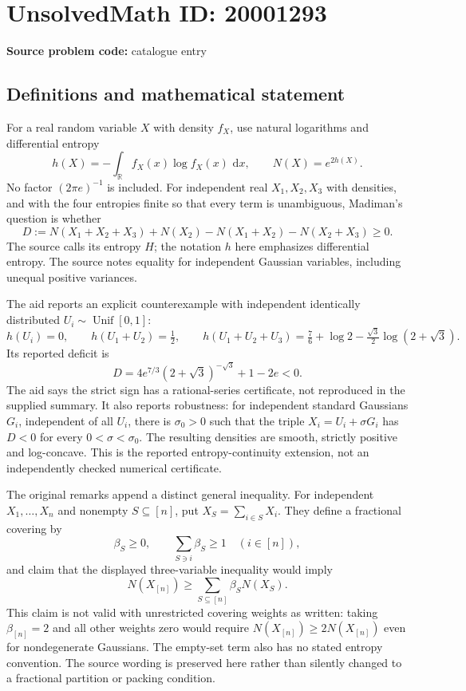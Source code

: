 \documentclass[11pt]{article}
\newcommand{\R}{\mathbb{R}}
\newcommand{\dd}{\,\mathrm{d}}
\begin{document}
\section*{UnsolvedMath ID: 20001293}
\textbf{Source problem code:} catalogue entry
\subsection{Definitions and mathematical statement}
For a real random variable \(X\) with density \(f_X\), use natural logarithms and differential entropy
\[
 h(X)=-\int_{\R}f_X(x)\log f_X(x)\,\dd x,\qquad N(X)=e^{2h(X)}.
\]
No factor \((2\pi e)^{-1}\) is included. For independent real \(X_1,X_2,X_3\) with densities, and with the four entropies finite so that every term is unambiguous, Madiman's question is whether
\[
 D:=N(X_1+X_2+X_3)+N(X_2)-N(X_1+X_2)-N(X_2+X_3)\geq0.
\]
The source calls its entropy \(H\); the notation \(h\) here emphasizes differential entropy. The source notes equality for independent Gaussian variables, including unequal positive variances.

The aid reports an explicit counterexample with independent identically distributed \(U_i\sim\operatorname{Unif}[0,1]\):
\[
 h(U_i)=0,\qquad h(U_1+U_2)=\tfrac12,\qquad
 h(U_1+U_2+U_3)=\tfrac76+\log2-\tfrac{\sqrt3}{2}\log(2+\sqrt3).
\]
Its reported deficit is
\[
 D=4e^{7/3}(2+\sqrt3)^{-\sqrt3}+1-2e<0.
\]
The aid says the strict sign has a rational-series certificate, not reproduced in the supplied summary. It also reports robustness: for independent standard Gaussians \(G_i\), independent of all \(U_i\), there is \(\sigma_0>0\) such that the triple \(X_i=U_i+\sigma G_i\) has \(D<0\) for every \(0<\sigma<\sigma_0\). The resulting densities are smooth, strictly positive and log-concave. This is the reported entropy-continuity extension, not an independently checked numerical certificate.

The original remarks append a distinct general inequality. For independent \(X_1,\ldots,X_n\) and nonempty \(S\subseteq[n]\), put \(X_S=\sum_{i\in S}X_i\). They define a fractional covering by
\[
 \beta_S\geq0,\qquad\sum_{S\ni i}\beta_S\geq1\quad(i\in[n]),
\]
and claim that the displayed three-variable inequality would imply
\[
 N(X_{[n]})\geq\sum_{S\subseteq[n]}\beta_SN(X_S).
\]
This claim is not valid with unrestricted covering weights as written: taking \(\beta_{[n]}=2\) and all other weights zero would require \(N(X_{[n]})\geq2N(X_{[n]})\) even for nondegenerate Gaussians. The empty-set term also has no stated entropy convention. The source wording is preserved here rather than silently changed to a fractional partition or packing condition.
\end{document}
